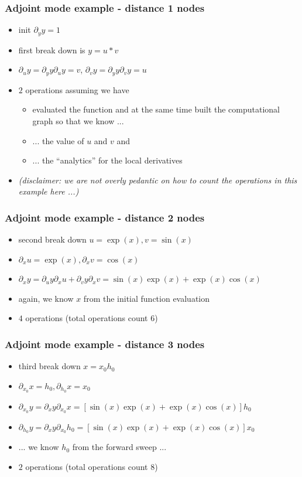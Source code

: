 \documentclass[10pt,German]{beamer}
\begin{document}
\begin{frame}[fragile]
\frametitle{Adjoint mode example - distance 1 nodes}
\begin{itemize}
\item init $\partial_y y = 1$
\item first break down is $y = u*v$
\item $\partial_u y = \partial_y y \partial _u y = v$, $\partial_v y = \partial_y y \partial _v y = u$
\item $2$ operations assuming we have
\begin{itemize}
\item evaluated the function and at the same time built the computational graph so that we know ...
\item ... the value of $u$ and $v$ and
\item ... the ``analytics'' for the local derivatives
\end{itemize}
\item \textit{(disclaimer: we are not overly pedantic on how to count the operations in this example here ...)}
\end{itemize}
\end{frame}

\begin{frame}[fragile]
\frametitle{Adjoint mode example - distance 2 nodes}
\begin{itemize}
\item second break down $u = \exp(x), v= \sin(x)$
\item $\partial_x u = \exp(x), \partial_x v = \cos(x)$
\item $\partial_x y = \partial_u y \partial_x u + \partial_v y \partial_x v = \sin(x)\exp(x)+\exp(x)\cos(x)$
\item again, we know $x$ from the initial function evaluation
\item $4$ operations (total operations count $6$)
\end{itemize}
\end{frame}

\begin{frame}[fragile]
\frametitle{Adjoint mode example - distance 3 nodes}
\begin{itemize}
\item third break down $x = x_0 h_0$
\item $\partial_{x_0} x = h_0, \partial_{h_0} x = x_0$
\item $\partial_{x_0} y = \partial_x y \partial_{x_0} x = [\sin(x)\exp(x)+\exp(x)\cos(x)] h_0$
\item $\partial_{h_0} y = \partial_x y \partial_{x_0} h_0 = [\sin(x)\exp(x)+\exp(x)\cos(x)] x_0$
\item ... we know $h_0$ from the forward sweep ...
\item $2$ operations (total operations count $8$)
\end{itemize}
\end{frame}
\end{document}
